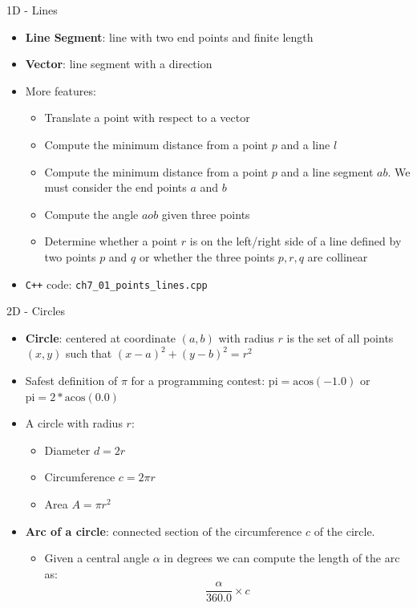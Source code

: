 \documentclass{beamer}
\begin{document}
\begin{frame}[fragile]{1D - Lines}
    \begin{itemize}
        \item \textbf{Line Segment}: line with two end points and finite length
        \item \textbf{Vector}: line segment with a direction
        \item More features:
            \begin{itemize}
                \item Translate a point with respect to a vector
                \item Compute the minimum distance from a point $p$ and a line $l$
                \item Compute the minimum distance from a point $p$ and a line segment $ab$. We must consider the end points $a$ and $b$
                \item Compute the angle $aob$ given three points
                \item Determine whether a point $r$ is on the left/right side of a line defined by two points $p$ and $q$ or whether the three points $p, r, q$ are collinear
            \end{itemize}
         \item \color{red} \verb|C++| code: \verb|ch7_01_points_lines.cpp| \color{black}
    \end{itemize}
\end{frame}

\begin{frame}{2D - Circles}
    \begin{itemize}
        \item \textbf{Circle}: centered at coordinate $(a,b)$ with radius $r$ is the set of all points $(x,y)$ such that $(x-a)^2 + (y-b)^2 = r^2$
        \item Safest definition of $\pi$ for a programming contest: $\text{pi} = \text{acos}(-1.0)$ or $\text{pi} = 2*\text{acos}(0.0)$
        \item A circle with radius $r$:
            \begin{itemize}
                \item Diameter $d = 2r$
                \item Circumference $c = 2\pi r$
                \item Area $A = \pi r^2$
            \end{itemize}
        \item \textbf{Arc of a circle}: connected section of the circumference $c$ of the circle.
            \begin{itemize}
                \item Given a central angle $\alpha$ in degrees we can compute the length of the arc as: $$\frac{\alpha}{360.0}\times c$$ 
            \end{itemize}
    \end{itemize}
\end{frame}
\end{document}

